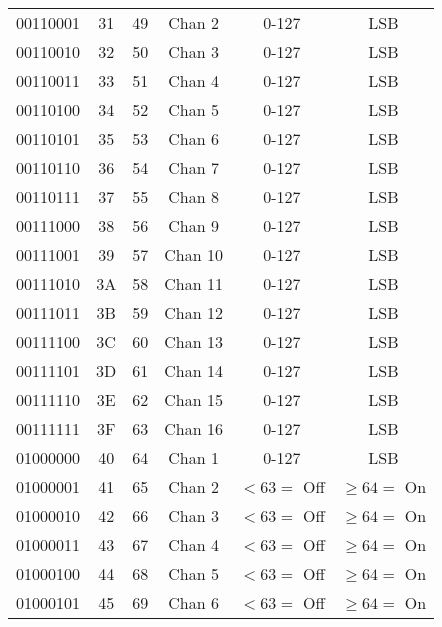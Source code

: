 \begin{center}
\begin{supertabular}{| c | c | c | c | c | c |}
                00110001 & 31 & 49  & Chan 2   & 0-127 & LSB \\
             00110010 & 32 & 50  & Chan 3   & 0-127 & LSB \\
                00110011 & 33 & 51  & Chan 4   & 0-127 & LSB \\
             00110100 & 34 & 52  & Chan 5   & 0-127 & LSB \\
                00110101 & 35 & 53  & Chan 6   & 0-127 & LSB \\
             00110110 & 36 & 54  & Chan 7   & 0-127 & LSB \\
                00110111 & 37 & 55  & Chan 8   & 0-127 & LSB \\
             00111000 & 38 & 56  & Chan 9   & 0-127 & LSB \\
                00111001 & 39 & 57  & Chan 10  & 0-127 & LSB \\
             00111010 & 3A & 58  & Chan 11  & 0-127 & LSB \\
                00111011 & 3B & 59  & Chan 12  & 0-127 & LSB \\
             00111100 & 3C & 60  & Chan 13  & 0-127 & LSB \\
                00111101 & 3D & 61  & Chan 14  & 0-127 & LSB \\
             00111110 & 3E & 62  & Chan 15  & 0-127 & LSB \\
                00111111 & 3F & 63  & Chan 16  & 0-127 & LSB \\
             01000000 & 40 & 64  & Chan 1   & 0-127 & LSB \\
                01000001 & 41 & 65  & Chan 2   & $< 63 =$  Off &  $\geq 64 =$ On \\
             01000010 & 42 & 66  & Chan 3   & $< 63 =$  Off &  $\geq 64 =$ On \\
                01000011 & 43 & 67  & Chan 4   & $< 63 =$  Off &  $\geq 64 =$ On \\
             01000100 & 44 & 68  & Chan 5   & $< 63 =$  Off &  $\geq 64 =$ On \\
                01000101 & 45 & 69  & Chan 6   & $< 63 =$  Off &  $\geq 64 =$ On \\

\end{supertabular}
\end{center}

